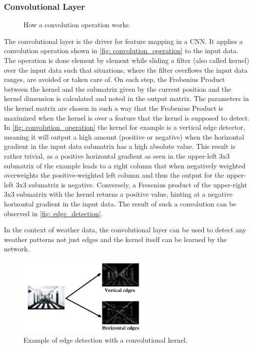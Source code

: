 \subsubsection*{Convolutional Layer}
\begin{figure}
    \centering
    \caption{How a convolution operation works. \cite{datahacker}}
    \label{fig: convolution_operation}
\end{figure}

The convolutional layer is the driver for feature mapping in a CNN. It applies a convolution operation shown in \autoref{fig: convolution_operation} to the input data. The operation is done element by element while sliding a filter (also called kernel) over the input data such that situations, where the filter overflows the input data ranges, are avoided or taken care of. On each step, the Frobenius Product between the kernel and the submatrix given by the current position and the kernel dimension is calculated and noted in the output matrix. The parameters in the kernel matrix are chosen in such a way that the Frobenius Product is maximized when the kernel is over a feature that the kernel is supposed to detect. In \autoref{fig: convolution_operation} the kernel for example is a vertical edge detector, meaning it will output a high amount (positive or negative) when the horizontal gradient in the input data submatrix has a high absolute value. This result is rather trivial, as a positive horizontal gradient as seen in the upper-left 3x3 submatrix of the example leads to a right column that when negatively weighted overweights the positive-weighted left column and thus the output for the upper-left 3x3 submatrix is negative. Conversely, a Fresenius product of the upper-right 3x3 submatrix with the kernel returns a positive value, hinting at a negative horizontal gradient in the input data. The result of such a convolution can be observed in \autoref{fig: edge_detection}.

In the context of weather data, the convolutional layer can be used to detect any weather patterns not just edges and the kernel itself can be learned by the network.

\begin{figure}
    \centering
    \includegraphics[width=250px]{resources/images/edge_detection.jpeg}
    \caption{Example of edge detection with a convolutional kernel. \cite{datahacker}}
    \label{fig: edge_detection}
\end{figure}

